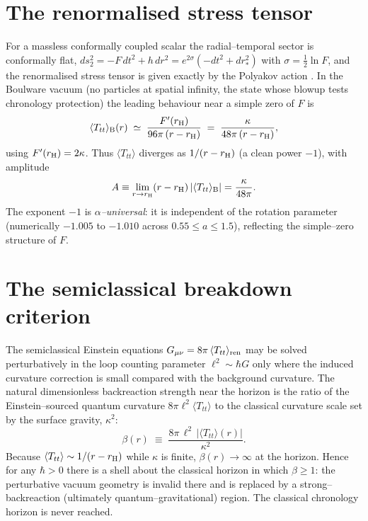 \documentclass[11pt]{article}
\newcommand{\Ttt}{\langle T_{tt}\rangle}
\newcommand{\rH}{r_{\rm H}}
\begin{document}
\section{The renormalised stress tensor}
For a massless conformally coupled scalar the radial--temporal sector is conformally flat,
$ds_{2}^{2}=-F\,dt^{2}+h\,dr^{2}=e^{2\sigma}(-dt^{2}+dr_{*}^{2})$ with $\sigma=\tfrac12\ln F$,
and the renormalised stress tensor is given exactly by the Polyakov action
\cite{DaviesFullingUnruh1976,BirrellDavies1982}. In the Boulware vacuum (no particles at
spatial infinity, the state whose blowup tests chronology protection) the leading behaviour
near a simple zero of $F$ is
\begin{equation}
\Ttt_{\rm B}(r)\;\simeq\;\frac{F'(\rH)}{96\pi\,(r-\rH)}
\;=\;\frac{\kappa}{48\pi\,(r-\rH)},
\label{eq:Tdiv}
\end{equation}
using $F'(\rH)=2\kappa$. Thus $\Ttt$ diverges as $1/(r-\rH)$ (a clean power $-1$), with amplitude
\begin{equation}
A\equiv\lim_{r\to\rH}(r-\rH)\,|\Ttt_{\rm B}|=\frac{\kappa}{48\pi}.
\label{eq:amp}
\end{equation}
The exponent $-1$ is \emph{$\alpha$--universal}: it is independent of the rotation parameter
(numerically $-1.005$ to $-1.010$ across $0.55\le a\le1.5$), reflecting the simple--zero
structure of $F$.

\section{The semiclassical breakdown criterion}
The semiclassical Einstein equations $G_{\mu\nu}=8\pi\,\Ttt_{\rm ren}$ may be solved
perturbatively in the loop counting parameter $\ell^{2}\sim\hbar G$ only where the induced
curvature correction is small compared with the background curvature. The natural dimensionless
backreaction strength near the horizon is the ratio of the Einstein--sourced quantum curvature
$8\pi\ell^{2}\Ttt$ to the classical curvature scale set by the surface gravity, $\kappa^{2}$:
\begin{equation}
\beta(r)\;\equiv\;\frac{8\pi\,\ell^{2}\,|\Ttt(r)|}{\kappa^{2}}.
\label{eq:beta}
\end{equation}
Because $\Ttt\sim1/(r-\rH)$ while $\kappa$ is finite, $\beta(r)\to\infty$ at the horizon. Hence
for any $\hbar>0$ there is a shell about the classical horizon in which $\beta\ge1$: the
perturbative vacuum geometry is invalid there and is replaced by a strong--backreaction
(ultimately quantum--gravitational) region. The classical chronology horizon is never reached.
\end{document}
